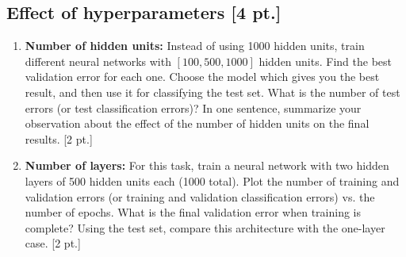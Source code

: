 \documentclass[12pt,letterpaper]{article}
\begin{document}
\subsection{Effect of hyperparameters [4 pt.]}
\begin{enumerate}
   \item  \textbf{Number of hidden units:}
Instead of using 1000 hidden units, train different neural networks with $[100, 500, 1000]$ hidden units. Find the best validation error for each one. Choose the model which gives you the best result, and then use it for classifying the test set. What is the number of test errors {\color{red}(or test classification errors)}? In one sentence, summarize your observation about the effect of the number of hidden units on the final results. [2 pt.]

   \item  \textbf{Number of layers:}
     For this task, train a neural network with two hidden layers of 500 hidden units each (1000 total). Plot the number of training and validation errors {\color{red}(or training and validation classification errors)} vs. the number of epochs. What is the final validation error when training is complete? Using the test set, compare this architecture with the one-layer case. [2 pt.]
\end{enumerate}
\end{document}
